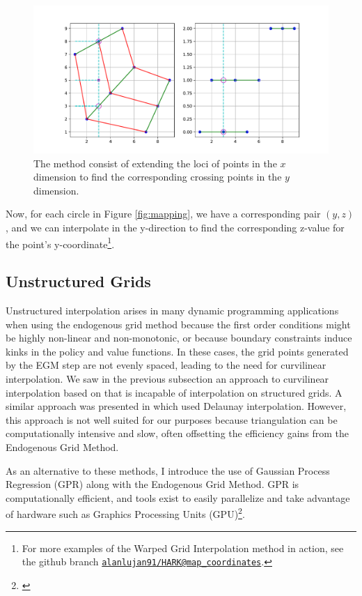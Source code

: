 \documentclass[\econtexRoot/SequentialEGM]{subfiles}
\begin{document}
\begin{figure}
	\centering
	\includegraphics[width=0.8\linewidth]{Figures/Mapping.pdf}
	\caption{The method consist of extending the loci of points in the $x$ dimension to find the corresponding crossing points in the $y$ dimension.}
	\notinsubfile{\label{fig:mapping}}
\end{figure}

Now, for each circle in Figure \ref{fig:mapping}, we have a corresponding pair $(y,z)$, and we can interpolate in the y-direction to find the corresponding z-value for the point's y-coordinate\footnote{For more examples of the Warped Grid Interpolation method in action, see the github branch \href{https://github.com/alanlujan91/HARK/blob/map\_coordinates/examples/Interpolation/CurvilinearInterpolation.ipynb}{\texttt{alanlujan91/HARK@map\_coordinates}}.}.

\subsection{Unstructured Grids}

Unstructured interpolation arises in many dynamic programming applications when using the endogenous grid method because the first order conditions might be highly non-linear and non-monotonic, or because boundary constraints induce kinks in the policy and value functions. In these cases, the grid points generated by the EGM step are not evenly spaced, leading to the need for curvilinear interpolation. We saw in the previous subsection an approach to curvilinear interpolation based on \cite{White2015-fg} that is incapable of interpolation on structured grids. A similar approach was presented in \cite{Ludwig2018-uz} which used Delaunay interpolation. However, this approach is not well suited for our purposes because triangulation can be computationally intensive and slow, often offsetting the efficiency gains from the Endogenous Grid Method.

As an alternative to these methods, I introduce the use of Gaussian Process Regression (GPR) along with the Endogenous Grid Method. GPR is computationally efficient, and tools exist to easily parallelize and take advantage of hardware such as Graphics Processing Units (GPU)\footnote{\cite{Gardner2018-mv}}.
\end{document}
